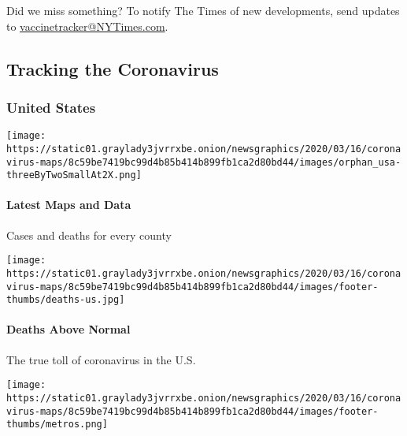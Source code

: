 Did we miss something? To notify The Times of new developments, send
updates to \href{null}{vaccinetracker@NYTimes.com}.

\hypertarget{tracking-the-coronavirus}{%
\subsection{Tracking the Coronavirus}\label{tracking-the-coronavirus}}

\hypertarget{united-states}{%
\subsubsection{United States}\label{united-states}}

\href{https://www.nytimes3xbfgragh.onion/interactive/2020/us/coronavirus-us-cases.html}{}

\texttt{[image: https://static01.graylady3jvrrxbe.onion/newsgraphics/2020/03/16/coronavirus-maps/8c59be7419bc99d4b85b414b899fb1ca2d80bd44/images/orphan\_usa-threeByTwoSmallAt2X.png]}

\hypertarget{latest-maps-and-data}{%
\paragraph{Latest Maps and Data}\label{latest-maps-and-data}}

Cases and deaths for every county

\href{https://www.nytimes3xbfgragh.onion/interactive/2020/05/05/us/coronavirus-death-toll-us.html}{}

\texttt{[image: https://static01.graylady3jvrrxbe.onion/newsgraphics/2020/03/16/coronavirus-maps/8c59be7419bc99d4b85b414b899fb1ca2d80bd44/images/footer-thumbs/deaths-us.jpg]}

\hypertarget{deaths-above-normal}{%
\paragraph{Deaths Above Normal}\label{deaths-above-normal}}

The true toll of coronavirus in the U.S.

\href{https://www.nytimes3xbfgragh.onion/interactive/2020/04/23/upshot/five-ways-to-monitor-coronavirus-outbreak-us.html}{}

\texttt{[image: https://static01.graylady3jvrrxbe.onion/newsgraphics/2020/03/16/coronavirus-maps/8c59be7419bc99d4b85b414b899fb1ca2d80bd44/images/footer-thumbs/metros.png]}

